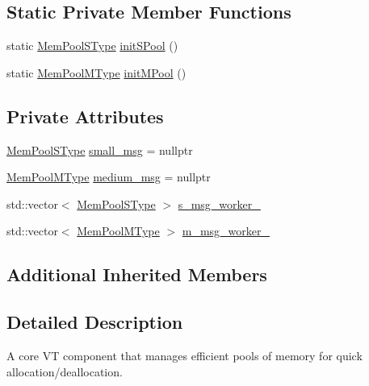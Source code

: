 \subsection*{Static Private Member Functions}
\begin{DoxyCompactItemize}
\item 
static \hyperlink{structvt_1_1pool_1_1_pool_a9f94985824d12c43357cfe50eaaefd38}{Mem\+Pool\+S\+Type} \hyperlink{structvt_1_1pool_1_1_pool_a833da3cd4d410ba607b6e7b000810882}{init\+S\+Pool} ()
\item 
static \hyperlink{structvt_1_1pool_1_1_pool_a8a201b9a843e47cd4e7b568a8e4483da}{Mem\+Pool\+M\+Type} \hyperlink{structvt_1_1pool_1_1_pool_ab768c364b348107112f960ce0704565d}{init\+M\+Pool} ()
\end{DoxyCompactItemize}
\subsection*{Private Attributes}
\begin{DoxyCompactItemize}
\item 
\hyperlink{structvt_1_1pool_1_1_pool_a9f94985824d12c43357cfe50eaaefd38}{Mem\+Pool\+S\+Type} \hyperlink{structvt_1_1pool_1_1_pool_a8f14f2f9b344882cf727200eb8d41845}{small\+\_\+msg} = nullptr
\item 
\hyperlink{structvt_1_1pool_1_1_pool_a8a201b9a843e47cd4e7b568a8e4483da}{Mem\+Pool\+M\+Type} \hyperlink{structvt_1_1pool_1_1_pool_a268cb9b30cde3272c49e67e781f0345e}{medium\+\_\+msg} = nullptr
\item 
std\+::vector$<$ \hyperlink{structvt_1_1pool_1_1_pool_a9f94985824d12c43357cfe50eaaefd38}{Mem\+Pool\+S\+Type} $>$ \hyperlink{structvt_1_1pool_1_1_pool_a9551faed42cf337990287481e158b01e}{s\+\_\+msg\+\_\+worker\+\_\+}
\item 
std\+::vector$<$ \hyperlink{structvt_1_1pool_1_1_pool_a8a201b9a843e47cd4e7b568a8e4483da}{Mem\+Pool\+M\+Type} $>$ \hyperlink{structvt_1_1pool_1_1_pool_a86b8d7208cd3e42c821e23f0ab654d26}{m\+\_\+msg\+\_\+worker\+\_\+}
\end{DoxyCompactItemize}
\subsection*{Additional Inherited Members}


\subsection{Detailed Description}
A core VT component that manages efficient pools of memory for quick allocation/deallocation. 

